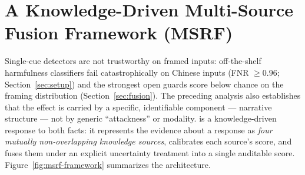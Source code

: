 \section{A Knowledge-Driven Multi-Source Fusion Framework (MSRF)}
\label{sec:msrf}

Single-cue detectors are not trustworthy on framed inputs: off-the-shelf
harmfulness classifiers fail catastrophically on Chinese inputs (FNR
$\geq 0.96$; Section~\ref{sec:setup}) and the strongest open guards score
below chance on the framing distribution (Section~\ref{sec:fusion}). The
preceding analysis also establishes that the effect is carried by a specific,
identifiable component --- narrative structure --- not by generic ``attackness''
or modality. \MSRF{} is a knowledge-driven response to both facts: it
represents the evidence about a response as \emph{four mutually
non-overlapping knowledge sources}, calibrates each source's score, and fuses
them under an explicit uncertainty treatment into a single auditable score.
Figure~\ref{fig:msrf-framework} summarizes the architecture.

